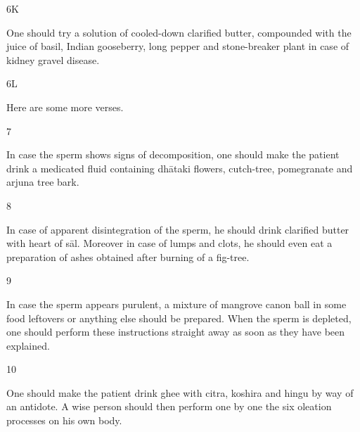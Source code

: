 \begin{translation}
 \item[6K]
 
  One should try a solution of cooled-down clarified butter, compounded with the 
  juice of basil, Indian gooseberry, long pepper and stone-breaker plant in case of 
  kidney gravel disease.
 
 \item[6L]
 
  Here are some more verses.
 
 \item[7]
 
  In case the sperm shows signs of decomposition, one should make the patient 
  drink a medicated fluid containing dhātaki flowers, cutch-tree, pomegranate 
  and arjuna tree bark.
 
 \item[8]
 
  In case of apparent disintegration of the sperm, he should drink clarified butter 
  with heart of sāl. Moreover in case of lumps and clots, he should even eat a 
  preparation of ashes obtained after burning of a fig-tree.
 
 \item[9]
 
  In case the sperm appears purulent, a mixture of mangrove canon ball in some 
  food leftovers or anything else should be prepared. When the sperm is 
  depleted, one should perform these instructions straight away as soon as they 
  have been explained.
 
 \item[10]
 
  One should make the patient drink ghee with citra, koshira and hingu by way of 
  an antidote. A wise person should then perform one by one the six oleation 
  processes on his own body.   
    
\end{translation}